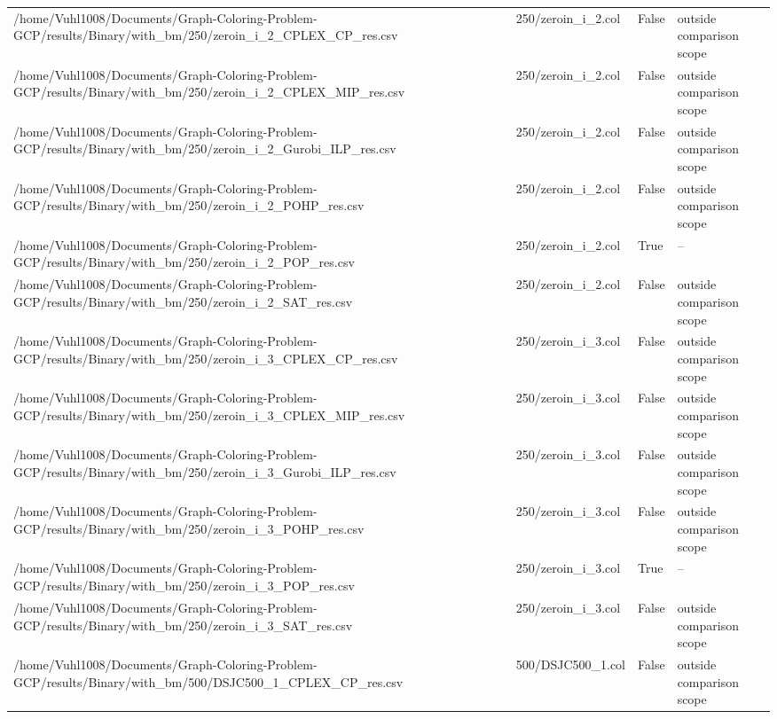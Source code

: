 \begin{table}[htbp]
\begin{tabular}{llll}
/home/Vuhl1008/Documents/Graph-Coloring-Problem-GCP/results/Binary/with\_bm/250/zeroin\_i\_2\_CPLEX\_CP\_res.csv & 250/zeroin\_i\_2.col & False & outside comparison scope \\
/home/Vuhl1008/Documents/Graph-Coloring-Problem-GCP/results/Binary/with\_bm/250/zeroin\_i\_2\_CPLEX\_MIP\_res.csv & 250/zeroin\_i\_2.col & False & outside comparison scope \\
/home/Vuhl1008/Documents/Graph-Coloring-Problem-GCP/results/Binary/with\_bm/250/zeroin\_i\_2\_Gurobi\_ILP\_res.csv & 250/zeroin\_i\_2.col & False & outside comparison scope \\
/home/Vuhl1008/Documents/Graph-Coloring-Problem-GCP/results/Binary/with\_bm/250/zeroin\_i\_2\_POHP\_res.csv & 250/zeroin\_i\_2.col & False & outside comparison scope \\
/home/Vuhl1008/Documents/Graph-Coloring-Problem-GCP/results/Binary/with\_bm/250/zeroin\_i\_2\_POP\_res.csv & 250/zeroin\_i\_2.col & True & -- \\
/home/Vuhl1008/Documents/Graph-Coloring-Problem-GCP/results/Binary/with\_bm/250/zeroin\_i\_2\_SAT\_res.csv & 250/zeroin\_i\_2.col & False & outside comparison scope \\
/home/Vuhl1008/Documents/Graph-Coloring-Problem-GCP/results/Binary/with\_bm/250/zeroin\_i\_3\_CPLEX\_CP\_res.csv & 250/zeroin\_i\_3.col & False & outside comparison scope \\
/home/Vuhl1008/Documents/Graph-Coloring-Problem-GCP/results/Binary/with\_bm/250/zeroin\_i\_3\_CPLEX\_MIP\_res.csv & 250/zeroin\_i\_3.col & False & outside comparison scope \\
/home/Vuhl1008/Documents/Graph-Coloring-Problem-GCP/results/Binary/with\_bm/250/zeroin\_i\_3\_Gurobi\_ILP\_res.csv & 250/zeroin\_i\_3.col & False & outside comparison scope \\
/home/Vuhl1008/Documents/Graph-Coloring-Problem-GCP/results/Binary/with\_bm/250/zeroin\_i\_3\_POHP\_res.csv & 250/zeroin\_i\_3.col & False & outside comparison scope \\
/home/Vuhl1008/Documents/Graph-Coloring-Problem-GCP/results/Binary/with\_bm/250/zeroin\_i\_3\_POP\_res.csv & 250/zeroin\_i\_3.col & True & -- \\
/home/Vuhl1008/Documents/Graph-Coloring-Problem-GCP/results/Binary/with\_bm/250/zeroin\_i\_3\_SAT\_res.csv & 250/zeroin\_i\_3.col & False & outside comparison scope \\
/home/Vuhl1008/Documents/Graph-Coloring-Problem-GCP/results/Binary/with\_bm/500/DSJC500\_1\_CPLEX\_CP\_res.csv & 500/DSJC500\_1.col & False & outside comparison scope \\

\end{tabular}
\end{table}
